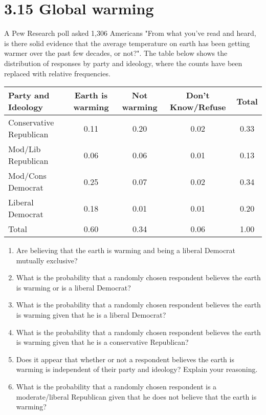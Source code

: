 \documentclass{article}
\begin{document}
\section*{3.15 Global warming}
A Pew Research poll asked 1,306 Americans "From what you've read and heard, is there solid evidence that the average temperature on earth has been getting warmer over the past few decades, or not?". The table below shows the distribution of responses by party and ideology, where the counts have been replaced with relative frequencies. 

\begin{table}[H]
\centering
\settowidth{}
\setlength\extrarowheight{2pt}
\begin{tabulary}{1.0\linewidth}{|L|C|C|C|C|}
\hline
\textbf{Party and Ideology} & \textbf{Earth is warming} & \textbf{Not warming} & \textbf{Don't Know/Refuse} & \textbf{Total} \\
\hline
Conservative Republican & 0.11 & 0.20 & 0.02 & 0.33 \\
Mod/Lib Republican & 0.06 & 0.06 & 0.01 & 0.13 \\
Mod/Cons Democrat & 0.25 & 0.07 & 0.02 & 0.34 \\
Liberal Democrat & 0.18 & 0.01 & 0.01 & 0.20 \\
\hline
Total & 0.60 & 0.34 & 0.06 & 1.00 \\
\hline
\end{tabulary}
\end{table}


\begin{enumerate}
    \item[(a)] Are believing that the earth is warming and being a liberal Democrat mutually exclusive?
    \item[(b)] What is the probability that a randomly chosen respondent believes the earth is warming or is a liberal Democrat?
    \item[(c)] What is the probability that a randomly chosen respondent believes the earth is warming given that he is a liberal Democrat?
    \item[(d)] What is the probability that a randomly chosen respondent believes the earth is warming given that he is a conservative Republican?
    \item[(e)] Does it appear that whether or not a respondent believes the earth is warming is independent of their party and ideology? Explain your reasoning.
    \item[(f)] What is the probability that a randomly chosen respondent is a moderate/liberal Republican given that he does not believe that the earth is warming?
\end{enumerate}
\end{document}
